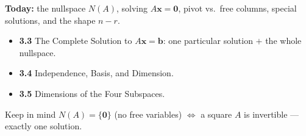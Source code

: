 \documentclass[aspectratio=169, 11pt]{beamer}
\newcommand{\xx}{\mathbf{x}}
\newcommand{\bb}{\mathbf{b}}
\newcommand{\zero}{\mathbf{0}}
\begin{document}
\begin{frame}[t, plain]
  \textbf{Today:} the nullspace $N(A)$, solving $A\xx=\zero$, pivot vs.\ free columns, special
  solutions, and the shape $n-r$.\\[8pt]
  \begin{itemize}
    \setlength{\itemsep}{4pt}
    \item \textbf{3.3} The Complete Solution to $A\xx=\bb$: one particular solution $+$ the whole nullspace.
    \item \textbf{3.4} Independence, Basis, and Dimension.
    \item \textbf{3.5} Dimensions of the Four Subspaces.
  \end{itemize}
  \vspace{4pt}
  \begin{block}{Keep in mind}
    $N(A)=\{\zero\}$ (no free variables) $\Leftrightarrow$ a square $A$ is invertible --- exactly one solution.
  \end{block}
\end{frame}
\end{document}
